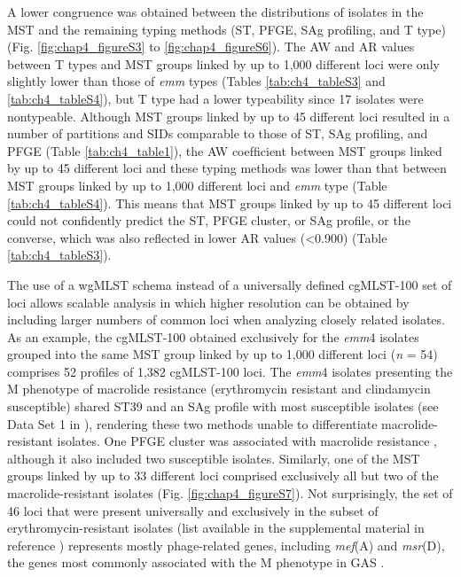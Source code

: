 A lower congruence was obtained between the distributions of isolates in the \ac{MST} and the remaining typing methods (\ac{ST}, \ac{PFGE}, SAg proﬁling, and T type) (Fig. \ref{fig:chap4_figureS3} to \ref{fig:chap4_figureS6}). The \ac{AW} and \ac{AR} values between T types and \ac{MST} groups linked by up to 1,000 different loci were only slightly lower than those of \textit{emm} types (Tables \ref{tab:ch4_tableS3} and \ref{tab:ch4_tableS4}), but T type had a lower typeability since 17 isolates were nontypeable. Although \ac{MST} groups linked by up to 45 different loci resulted in a number of partitions and \ac{SID}s comparable to those of \ac{ST}, SAg proﬁling, and \ac{PFGE} (Table \ref{tab:ch4_table1}), the \ac{AW} coefﬁcient between \ac{MST} groups linked by up to 45 different loci and these typing methods was lower than that between \ac{MST} groups linked by up to 1,000 different loci and \textit{emm} type (Table \ref{tab:ch4_tableS4}). This means that \ac{MST} groups linked by up to 45 different loci could not conﬁdently predict the \ac{ST}, \ac{PFGE} cluster, or SAg proﬁle, or the converse, which was also reﬂected in lower \ac{AR} values (<0.900) (Table \ref{tab:ch4_tableS3}).

The use of a \ac{wgMLST} schema instead of a universally deﬁned cgMLST-100 set of loci allows scalable analysis in which higher resolution can be obtained by including larger numbers of common loci when analyzing closely related isolates. As an example, the cgMLST-100 obtained exclusively for the \textit{emm}4 isolates grouped into the same \ac{MST} group linked by up to 1,000 different loci (\textit{n} = 54) comprises 52 proﬁles of 1,382 cgMLST-100 loci. The \textit{emm}4 isolates presenting the M phenotype of macrolide resistance (erythromycin resistant and clindamycin susceptible) shared ST39 and an SAg proﬁle with most susceptible isolates (see Data Set 1 in \cite{friaes_supplemental_2023}), rendering these two methods unable to differentiate macrolide-resistant isolates. One \ac{PFGE} cluster was associated with macrolide resistance \cite{silva-costa_differences_2012}, although it also included two susceptible isolates. Similarly, one of the \ac{MST} groups linked by up to 33 different loci comprised exclusively all but two of the macrolide-resistant isolates (Fig. \ref{fig:chap4_figureS7}). Not surprisingly, the set of 46 loci that were present universally and exclusively in the subset of erythromycin-resistant isolates (list available in the supplemental material in reference \cite{friaes_supplemental_2023}) represents mostly phage-related genes, including \textit{mef}(A) and \textit{msr}(D), the genes most commonly associated with the M phenotype in \ac{GAS} \cite{silva-costa_macrolide-resistant_2015, iannelli_type_2018}.

